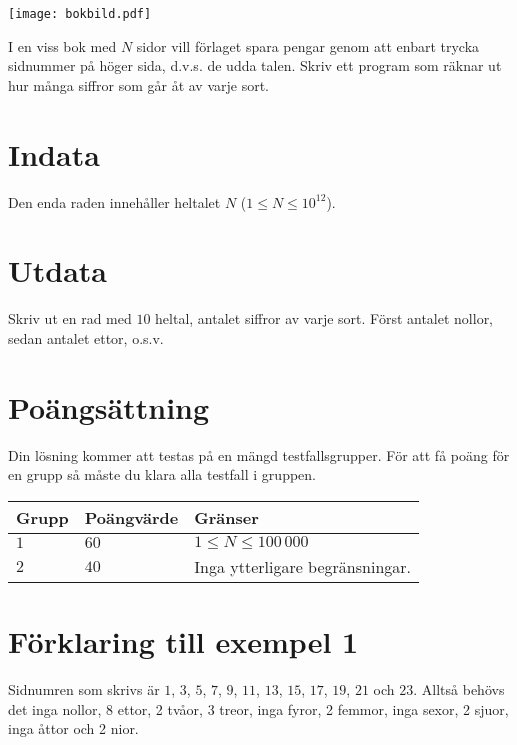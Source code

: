
\begin{center}
\texttt{[image: bokbild.pdf]}
\end{center}
 
I en viss bok med $N$ sidor vill förlaget spara pengar genom att enbart trycka
sidnummer på höger sida, d.v.s. de udda talen. Skriv ett program som
räknar ut hur många siffror som går åt av varje sort.

\section*{Indata}
Den enda raden innehåller heltalet $N$ ($1 \leq N \leq 10^12$).

\section*{Utdata}
Skriv ut en rad med $10$ heltal, antalet siffror av varje sort. Först antalet nollor, sedan antalet ettor, o.s.v.


\section*{Poängsättning}
Din lösning kommer att testas på en mängd testfallsgrupper.
För att få poäng för en grupp så måste du klara alla testfall i gruppen.

\noindent
\begin{tabular}{| l | l | l |}
\hline
  Grupp & Poängvärde & Gränser \\ \hline
  $1$    & $60$       &  $1 \le N \le 100\,000$   \\ \hline 
  $2$    & $40$       &  Inga ytterligare begränsningar. \\ \hline
\end{tabular}


\section*{Förklaring till exempel 1}

Sidnumren som skrivs är $1$, $3$, $5$, $7$, $9$, $11$, $13$, $15$,
$17$, $19$, $21$ och $23$. Alltså behövs det inga nollor, 8 ettor, 2 tvåor, 3
treor, inga fyror, 2 femmor, inga sexor, 2 sjuor, inga åttor och 2 nior.


